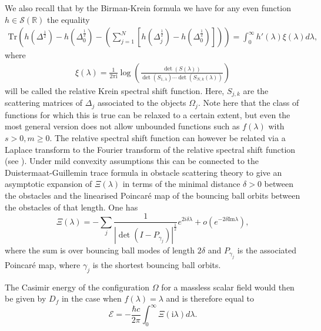 We also recall that by the Birman-Krein formula we have for any even function $h \in \mathcal{S}(\mathbb{R})$ the equality
\begin{align}\label{B-K formula}
    \text{Tr}\left(h(\Delta^{\frac{1}{2}}) - h(\Delta_{0}^{\frac{1}{2}}) - \left(\sum_{j = 1}^{N}[h(\Delta_{j}^{\frac{1}{2}}) - h(\Delta_{0}^{\frac{1}{2}})]\right)\right)  = \int_{0}^{\infty}h'(\lambda)\xi(\lambda)d \lambda,
\end{align}
where 
\begin{align*}
    \xi(\lambda) = \frac{1}{2\pi \mathrm{i}}\log\left(\frac{\det(S(\lambda))}{\det(S_{1,\lambda})\cdots\det(S_{N,k}(\lambda))}\right)
\end{align*}
will be called the relative Krein spectral shift function. Here, $S_{j,k}$ are the scattering matrices of $\Delta_{j}$ associated to the objects $\Omega_{j}$. Note here that the class of functions for which this is true can be relaxed to a certain extent, but even the most general version does not allow unbounded functions such as $f(\lambda)$ with $s>0, m\geq 0$.
The relative spectral shift function can however be related via a Laplace transform to the Fourier transform of the relative spectral shift function (see \cite{fang2021singularity}). Under mild convexity assumptions this can be connected to the Duistermaat-Guillemin trace formula in obstacle scattering theory to give an asymptotic expansion of  $\Xi(\lambda)$ 
in terms of the minimal distance $\delta>0$ between the obstacles and the linearised Poincar\'e map of the bouncing ball orbits between the obstacles of that length. One has
$$
 \Xi(\lambda) =- \sum_{j} \frac{1}{|\det(I - P_{\gamma_j})|^{\frac{1}{2}}} e^{2 i \delta \lambda} + o(e^{- 2 \delta \text{Im}{\lambda}}),
$$
where the sum is over  bouncing ball modes of length $2 \delta$ and $P_{\gamma_j}$ is the associated Poincar\'e map, where $\gamma_{j}$ is the shortest bouncing ball orbits. 

The Casimir energy of the configuration $\Omega$ for a massless scalar field would then be given by $D_f$ in the case when $f(\lambda)=\lambda$ and is therefore equal to
$$
\mathcal{E} = -\frac{\hbar c}{2 \pi} \int _{0}^{\infty} \Xi(\mathrm{i} \lambda) d \lambda.
$$

